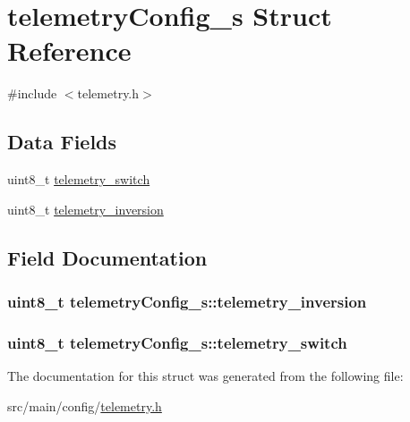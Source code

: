 \hypertarget{structtelemetryConfig__s}{\section{telemetry\+Config\+\_\+s Struct Reference}
\label{structtelemetryConfig__s}
}


{\ttfamily \#include $<$telemetry.\+h$>$}

\subsection*{Data Fields}
\begin{DoxyCompactItemize}
\item 
uint8\+\_\+t \hyperlink{structtelemetryConfig__s_abe4f3f0e787509a818661ba991ec90ef}{telemetry\+\_\+switch}
\item 
uint8\+\_\+t \hyperlink{structtelemetryConfig__s_a64d5bda3e1540155d763e351ff7a73e9}{telemetry\+\_\+inversion}
\end{DoxyCompactItemize}


\subsection{Field Documentation}
\hypertarget{structtelemetryConfig__s_a64d5bda3e1540155d763e351ff7a73e9}{
\subsubsection[{telemetry\+\_\+inversion}]{\setlength{\rightskip}{0pt plus 5cm}uint8\+\_\+t telemetry\+Config\+\_\+s\+::telemetry\+\_\+inversion}}\label{structtelemetryConfig__s_a64d5bda3e1540155d763e351ff7a73e9}
\hypertarget{structtelemetryConfig__s_abe4f3f0e787509a818661ba991ec90ef}{
\subsubsection[{telemetry\+\_\+switch}]{\setlength{\rightskip}{0pt plus 5cm}uint8\+\_\+t telemetry\+Config\+\_\+s\+::telemetry\+\_\+switch}}\label{structtelemetryConfig__s_abe4f3f0e787509a818661ba991ec90ef}


The documentation for this struct was generated from the following file\+:\begin{DoxyCompactItemize}
\item 
src/main/config/\hyperlink{config_2telemetry_8h}{telemetry.\+h}\end{DoxyCompactItemize}
